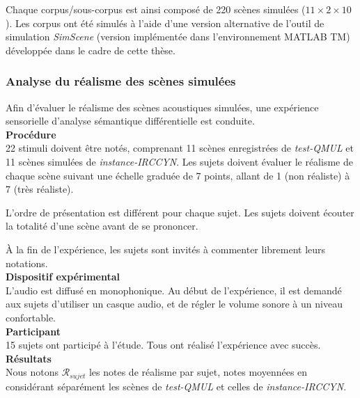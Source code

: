 Chaque corpus/sous-corpus est ainsi composé de 220 scènes simulées ($11\times2\times10$). Les corpus ont été simulés à l'aide d'une version alternative de l'outil de simulation \emph{SimScene} (version implémentée dans l'environnement MATLAB TM) développée dans le cadre de cette thèse.

\subsubsection{Analyse du réalisme des scènes simulées}

Afin d'évaluer le réalisme des scènes acoustiques simulées, une expérience sensorielle d'analyse sémantique différentielle est conduite. \\

{\setlength{\parindent}{0cm}\textbf{Procédure}} \\

22 stimuli doivent être notés, comprenant 11 scènes enregistrées de \emph{test-QMUL} et 11 scènes simulées de \emph{instance-IRCCYN}. Les sujets doivent évaluer le réalisme de chaque scène suivant une échelle graduée de 7 points, allant de 1 (non réaliste) à 7 (très réaliste). 

L'ordre de présentation est différent pour chaque sujet. Les sujets doivent écouter la totalité d'une scène avant de se prononcer.

À la fin de l'expérience, les sujets sont invités à commenter librement leurs notations. \\

{\setlength{\parindent}{0cm}\textbf{Dispositif expérimental}} \\

L'audio est diffusé en monophonique. Au début de l'expérience, il est demandé aux sujets d'utiliser un casque audio, et de régler le volume sonore à un niveau confortable.  \\

{\setlength{\parindent}{0cm}\textbf{Participant}} \\

15 sujets ont participé à l'étude. Tous ont réalisé l'expérience avec succès. \\

{\setlength{\parindent}{0cm}\textbf{Résultats}} \\

Nous notons $\mathcal{R}_{sujet}$ les notes de réalisme par sujet, notes moyennées en considérant séparément les scènes de \emph{test-QMUL} et celles de \emph{instance-IRCCYN}.

